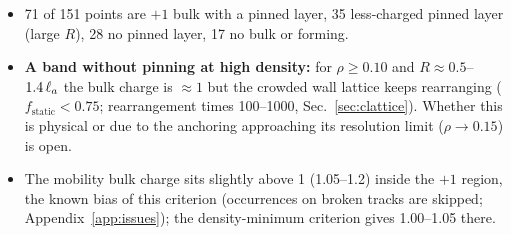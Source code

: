\begin{itemize}
  \item 71 of 151 points are $+1$ bulk with a pinned layer, 35 less-charged pinned layer (large $R$), 28 no pinned layer, 17 no bulk or forming.
  \item \textbf{A band without pinning at high density:} for $\rho\ge0.10$ and $R\approx0.5$--$1.4\,\ell_a$ the bulk charge is $\approx1$ but the
        crowded wall lattice keeps rearranging ($f_\mathrm{static}<0.75$; rearrangement times 100--1000, Sec.~\ref{sec:clattice}). Whether this
        is physical or due to the anchoring approaching its resolution limit ($\rho\to0.15$) is open.
  \item The mobility bulk charge sits slightly above 1 (1.05--1.2) inside the $+1$ region, the known bias of this criterion
        (occurrences on broken tracks are skipped; Appendix~\ref{app:issues}); the density-minimum criterion gives 1.00--1.05 there.
\end{itemize}

